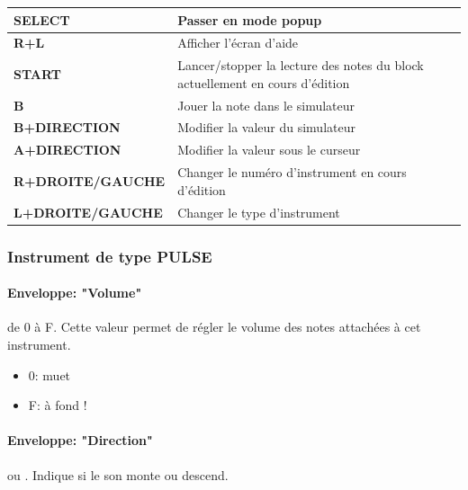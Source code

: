 \documentclass[12pt,a4paper]{article}
\begin{document}
    \tablelasttail{\hline}
    \begin{supertabular}{|l|p{11cm}|}
    \hline
        {\bf SELECT} & Passer en mode popup \\
        \hline
        {\bf R+L} & Afficher l'écran d'aide \\
        \hline
        {\bf START} & Lancer/stopper la lecture des notes du block actuellement en cours d'édition \\
        \hline
        {\bf B} & Jouer la note dans le simulateur \\
        \hline
        {\bf B+DIRECTION} & Modifier la valeur du simulateur \\
        \hline
        {\bf A+DIRECTION} & Modifier la valeur sous le curseur \\
        \hline
        {\bf R+DROITE/GAUCHE} & Changer le numéro d'instrument en cours d'édition \\
        \hline
        {\bf L+DROITE/GAUCHE} & Changer le type d'instrument \\
    \hline
    \end{supertabular}

    \subsubsection{Instrument de type PULSE}
        

    \paragraph{Enveloppe: "Volume"} de 0 à F.
    Cette valeur permet de régler le volume des notes attachées à cet instrument.
    \medskip

    \begin{itemize}
        \item{0: muet}
        \item{F: à fond !}
    \end{itemize}

    \paragraph{Enveloppe: "Direction"}  ou .
    Indique si le son monte ou descend.
\end{document}

